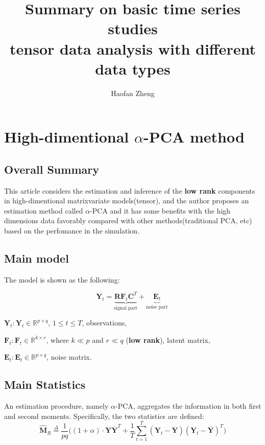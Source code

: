 \documentclass{article}[12pt]
\title{\textbf{Summary on basic time series studies\\ \large tensor data analysis with different data types}}
\author{Haofan Zheng}
\date{}
\begin{document}
\maketitle
\newpage
\tableofcontents
\newpage

\section{High-dimentional $\alpha$-PCA method}

\subsection{Overall Summary}

\noindent This article considers the estimation and inference of the \textbf{low rank} components in high-dimentional matrixvariate models(tensor), and the author proposes an estimation method called $\alpha$-PCA and it has some benefits with the high dimensions data favorably compared with other methods(traditional PCA, etc) based on the perfomance in the simulation.



\subsection{Main model}\label{section main model 1.2}

\noindent The model is shown as the following:

\begin{equation}
    \mathbf{Y}_t = \underbrace{\mathbf{R}\mathbf{F}_t\mathbf{C}^T}_\text{signal part}+ \underbrace{\mathbf{E}_t}_\text{noise part}\
    \label{expression main model 1.2}
\end{equation}


$\mathbf{Y}_t: \mathbf{Y}_t\in \mathbb{R}^{p\times q}$, $1\leq t \leq T$, observations,

$\mathbf{F}_t: \mathbf{F}_t\in \mathbb{R}^{k\times r}$, where $k\ll p$ and $r\ll q$ (\textbf{low rank}), latent matrix,

$\mathbf{E}_t: \mathbf{E}_t\in \mathbb{R}^{p \times q}$, noise matrix.

\subsection{Main Statistics}\label{section main statistics 1.3}

\noindent An estimation procedure, namely $\alpha$-PCA, aggregates the information in both first and second moments. Specifically, the two statistics are defined:
\begin{equation}
    \mathbf{\widehat{M}}_R  \overset{\Delta}{=} \dfrac{1}{pq}\Bigg((1 + \alpha) \cdot \mathbf{\overline{Y}}\mathbf{\overline{Y}}^T + \dfrac{1}{T}\sum\limits_{t=1}^T(\mathbf{Y}_t - \mathbf{\overline{Y}})(\mathbf{Y}_t - \mathbf{\overline{Y}})^T\Bigg)
    \label{equation statistics MR 1.3}
\end{equation}
\end{document}
